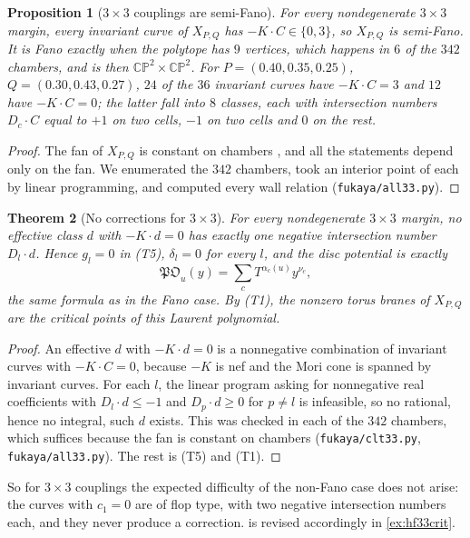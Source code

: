 \documentclass[11pt]{article}
\newtheorem{theorem}{Theorem}[section]
\newtheorem{proposition}[theorem]{Proposition}
\theoremstyle{definition}
\theoremstyle{remark}
\begin{document}
\begin{proposition}[$3\times3$ couplings are semi-Fano]\label{prop:semifano33}
For every nondegenerate $3\times3$ margin, every invariant curve of $X_{P,Q}$ has $-K\cdot C\in\{0,3\}$, so $X_{P,Q}$ is semi-Fano. It is Fano
exactly when the polytope has $9$ vertices, which happens in $6$ of the $342$ chambers, and is then $\mathbb{CP}^2\times\mathbb{CP}^2$. For
$P=(0.40,0.35,0.25)$, $Q=(0.30,0.43,0.27)$, $24$ of the $36$ invariant curves have $-K\cdot C=3$ and $12$ have $-K\cdot C=0$; the latter fall into $8$
classes, each with intersection numbers $D_c\cdot C$ equal to $+1$ on two cells, $-1$ on two cells and $0$ on the rest.
\end{proposition}
\begin{proof}
The fan of $X_{P,Q}$ is constant on chambers \cite[Prop.~6.6]{Conditionals}, and all the statements depend only on the fan. We enumerated the
$342$ chambers, took an interior point of each by linear programming, and computed every wall relation (\texttt{fukaya/all33.py}).
\end{proof}

\begin{theorem}[No corrections for $3\times3$]\label{thm:nocorr}
For every nondegenerate $3\times3$ margin, no effective class $d$ with $-K\cdot d=0$ has
exactly one negative intersection number $D_l\cdot d$. Hence $g_l=0$ in (T5), $\delta_l=0$ for every $l$, and the disc potential is exactly
\[
\mathfrak{PO}_u(y)=\sum_{c}T^{\alpha_c(u)}y^{\nu_c},
\]
the same formula as in the Fano case. By (T1), the nonzero torus branes of $X_{P,Q}$ are the critical points of this Laurent polynomial.
\end{theorem}
\begin{proof}
An effective $d$ with $-K\cdot d=0$ is a nonnegative combination of invariant curves with $-K\cdot C=0$, because $-K$ is nef and the Mori cone is
spanned by invariant curves. For each $l$, the linear program asking for nonnegative real coefficients with $D_l\cdot d\le-1$ and $D_p\cdot d\ge0$
for $p\ne l$ is infeasible, so no rational, hence no integral, such $d$ exists. This was checked in each of the $342$ chambers, which suffices because
the fan is constant on chambers (\texttt{fukaya/clt33.py}, \texttt{fukaya/all33.py}). The rest is (T5) and (T1).
\end{proof}

So for $3\times3$ couplings the expected difficulty of the non-Fano case does not arise: the curves with $c_1=0$ are of flop type,
with two negative intersection numbers each, and they never produce a correction.  is revised accordingly in
\cref{ex:hf33crit}.
\end{document}
